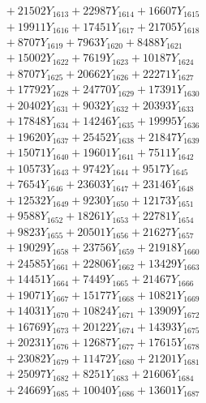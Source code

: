\documentclass[a4paper,10pt]{article}
\begin{document}
{\begin{align}
&\;  + 21502 Y_{1613} + 22987 Y_{1614} + 16607 Y_{1615} \\[0.3ex]
&\;  + 19911 Y_{1616} + 17451 Y_{1617} + 21705 Y_{1618} \\[0.5ex]\allowbreak
&\;  + 8707 Y_{1619} + 7963 Y_{1620} + 8488 Y_{1621} \\[0.3ex]
&\;  + 15002 Y_{1622} + 7619 Y_{1623} + 10187 Y_{1624} \\[0.3ex]
&\;  + 8707 Y_{1625} + 20662 Y_{1626} + 22271 Y_{1627} \\[0.3ex]
&\;  + 17792 Y_{1628} + 24770 Y_{1629} + 17391 Y_{1630} \\[0.3ex]
&\;  + 20402 Y_{1631} + 9032 Y_{1632} + 20393 Y_{1633} \\[0.3ex]
&\;  + 17848 Y_{1634} + 14246 Y_{1635} + 19995 Y_{1636} \\[0.3ex]
&\;  + 19620 Y_{1637} + 25452 Y_{1638} + 21847 Y_{1639} \\[0.3ex]
&\;  + 15071 Y_{1640} + 19601 Y_{1641} + 7511 Y_{1642} \\[0.3ex]
&\;  + 10573 Y_{1643} + 9742 Y_{1644} + 9517 Y_{1645} \\[0.3ex]
&\;  + 7654 Y_{1646} + 23603 Y_{1647} + 23146 Y_{1648} \\[0.5ex]\allowbreak
&\;  + 12532 Y_{1649} + 9230 Y_{1650} + 12173 Y_{1651} \\[0.3ex]
&\;  + 9588 Y_{1652} + 18261 Y_{1653} + 22781 Y_{1654} \\[0.3ex]
&\;  + 9823 Y_{1655} + 20501 Y_{1656} + 21627 Y_{1657} \\[0.3ex]
&\;  + 19029 Y_{1658} + 23756 Y_{1659} + 21918 Y_{1660} \\[0.3ex]
&\;  + 24585 Y_{1661} + 22806 Y_{1662} + 13429 Y_{1663} \\[0.3ex]
&\;  + 14451 Y_{1664} + 7449 Y_{1665} + 21467 Y_{1666} \\[0.3ex]
&\;  + 19071 Y_{1667} + 15177 Y_{1668} + 10821 Y_{1669} \\[0.3ex]
&\;  + 14031 Y_{1670} + 10824 Y_{1671} + 13909 Y_{1672} \\[0.3ex]
&\;  + 16769 Y_{1673} + 20122 Y_{1674} + 14393 Y_{1675} \\[0.3ex]
&\;  + 20231 Y_{1676} + 12687 Y_{1677} + 17615 Y_{1678} \\[0.5ex]\allowbreak
&\;  + 23082 Y_{1679} + 11472 Y_{1680} + 21201 Y_{1681} \\[0.3ex]
&\;  + 25097 Y_{1682} + 8251 Y_{1683} + 21606 Y_{1684} \\[0.3ex]
&\;  + 24669 Y_{1685} + 10040 Y_{1686} + 13601 Y_{1687} \\[0.3ex]

\end{align}}
\end{document}
